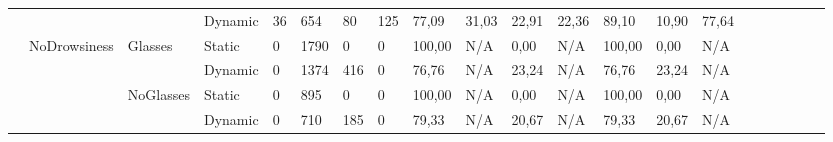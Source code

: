 \documentclass[12pt]{article}
\begin{document}
\begin{landscape}
\begin{table}[]
\begin{adjustbox}{width=1.4\textwidth}
\begin{tabular}{lllllllllllllllccllll}
				\multicolumn{1}{|l|}{} & \multicolumn{1}{l|}{} & \multicolumn{1}{l|}{} & \multicolumn{1}{l|}{Dynamic} & \multicolumn{1}{l|}{36} & \multicolumn{1}{l|}{654} & \multicolumn{1}{l|}{80} & \multicolumn{1}{l|}{125} & \multicolumn{1}{l|}{77,09} & \multicolumn{1}{l|}{31,03} & \multicolumn{1}{l|}{22,91} & \multicolumn{1}{l|}{22,36} & \multicolumn{1}{l|}{89,10} & \multicolumn{1}{l|}{10,90} & \multicolumn{1}{l|}{77,64} & \multicolumn{1}{c|}{} & \multicolumn{1}{c|}{} & \multicolumn{1}{l|}{} & \multicolumn{1}{l|}{} & \multicolumn{1}{l|}{} & \multicolumn{1}{l|}{} \\ \cline{2-15}
				\multicolumn{1}{|l|}{} & \multicolumn{1}{l|}{\multirow{4}{*}{NoDrowsiness}} & \multicolumn{1}{l|}{\multirow{2}{*}{Glasses}} & \multicolumn{1}{l|}{Static} & \multicolumn{1}{l|}{0} & \multicolumn{1}{l|}{1790} & \multicolumn{1}{l|}{0} & \multicolumn{1}{l|}{0} & \multicolumn{1}{l|}{100,00} & \multicolumn{1}{l|}{N/A} & \multicolumn{1}{l|}{0,00} & \multicolumn{1}{l|}{N/A} & \multicolumn{1}{l|}{100,00} & \multicolumn{1}{l|}{0,00} & \multicolumn{1}{l|}{N/A} & \multicolumn{1}{c|}{} & \multicolumn{1}{c|}{} & \multicolumn{1}{l|}{} & \multicolumn{1}{l|}{} & \multicolumn{1}{l|}{} & \multicolumn{1}{l|}{} \\ \cline{4-15}
				\multicolumn{1}{|l|}{} & \multicolumn{1}{l|}{} & \multicolumn{1}{l|}{} & \multicolumn{1}{l|}{Dynamic} & \multicolumn{1}{l|}{0} & \multicolumn{1}{l|}{1374} & \multicolumn{1}{l|}{416} & \multicolumn{1}{l|}{0} & \multicolumn{1}{l|}{76,76} & \multicolumn{1}{l|}{N/A} & \multicolumn{1}{l|}{23,24} & \multicolumn{1}{l|}{N/A} & \multicolumn{1}{l|}{76,76} & \multicolumn{1}{l|}{23,24} & \multicolumn{1}{l|}{N/A} & \multicolumn{1}{c|}{} & \multicolumn{1}{c|}{} & \multicolumn{1}{l|}{} & \multicolumn{1}{l|}{} & \multicolumn{1}{l|}{} & \multicolumn{1}{l|}{} \\ \cline{3-15}
				\multicolumn{1}{|l|}{} & \multicolumn{1}{l|}{} & \multicolumn{1}{l|}{\multirow{2}{*}{NoGlasses}} & \multicolumn{1}{l|}{Static}  & \multicolumn{1}{l|}{0} & \multicolumn{1}{l|}{895} & \multicolumn{1}{l|}{0} & \multicolumn{1}{l|}{0} & \multicolumn{1}{l|}{100,00} & \multicolumn{1}{l|}{N/A} & \multicolumn{1}{l|}{0,00} & \multicolumn{1}{l|}{N/A} & \multicolumn{1}{l|}{100,00} & \multicolumn{1}{l|}{0,00} & \multicolumn{1}{l|}{N/A} & \multicolumn{1}{c|}{} & \multicolumn{1}{c|}{} & \multicolumn{1}{l|}{} & \multicolumn{1}{l|}{} & \multicolumn{1}{l|}{} & \multicolumn{1}{l|}{} \\ \cline{4-15}
				\multicolumn{1}{|l|}{} & \multicolumn{1}{l|}{} & \multicolumn{1}{l|}{} & \multicolumn{1}{l|}{Dynamic} & \multicolumn{1}{l|}{0} & \multicolumn{1}{l|}{710} & \multicolumn{1}{l|}{185} & \multicolumn{1}{l|}{0} & \multicolumn{1}{l|}{79,33} & \multicolumn{1}{l|}{N/A} & \multicolumn{1}{l|}{20,67} & \multicolumn{1}{l|}{N/A} & \multicolumn{1}{l|}{79,33} & \multicolumn{1}{l|}{20,67} & \multicolumn{1}{l|}{N/A} & \multicolumn{1}{c|}{} & \multicolumn{1}{c|}{} & \multicolumn{1}{l|}{} & \multicolumn{1}{l|}{} & \multicolumn{1}{l|}{} & \multicolumn{1}{l|}{} \\ \hline

\end{tabular}
\end{adjustbox}
\end{table}
\end{landscape}
\end{document}

